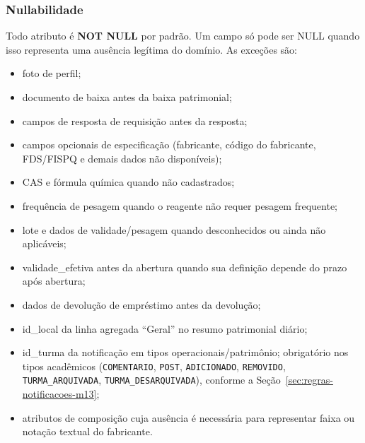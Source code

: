 \subsubsection{Nullabilidade}
Todo atributo é \textbf{NOT NULL} por padrão. Um campo só pode ser NULL quando isso representa uma ausência legítima do domínio. As exceções são:
\begin{itemize}
    \item foto de perfil;
    \item documento de baixa antes da baixa patrimonial;
    \item campos de resposta de requisição antes da resposta;
    \item campos opcionais de especificação (fabricante, código do fabricante, FDS/FISPQ e demais dados não disponíveis);
    \item CAS e fórmula química quando não cadastrados;
    \item frequência de pesagem quando o reagente não requer pesagem frequente;
    \item lote e dados de validade/pesagem quando desconhecidos ou ainda não aplicáveis;
    \item validade\_efetiva antes da abertura quando sua definição depende do prazo após abertura;
    \item dados de devolução de empréstimo antes da devolução;
    \item id\_local da linha agregada ``Geral'' no resumo patrimonial diário;
    \item id\_turma da notificação em tipos operacionais/patrimônio; obrigatório nos tipos acadêmicos (\texttt{COMENTARIO}, \texttt{POST}, \texttt{ADICIONADO}, \texttt{REMOVIDO}, \texttt{TURMA\_ARQUIVADA}, \texttt{TURMA\_DESARQUIVADA}), conforme a Seção~\ref{sec:regras-notificacoes-m13};
    \item atributos de composição cuja ausência é necessária para representar faixa ou notação textual do fabricante.
\end{itemize}

